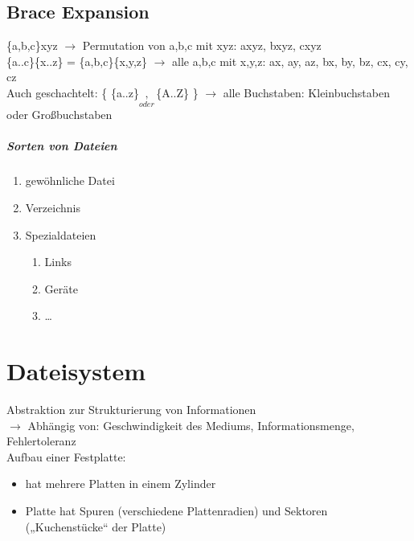 \section{Brace Expansion}
\{a,b,c\}xyz $\to$ Permutation von a,b,c mit xyz: axyz, bxyz, cxyz\\
\{a..c\}\{x..z\} = \{a,b,c\}\{x,y,z\} $\to$ alle a,b,c mit x,y,z: ax, ay, az, bx, by, bz, cx, cy, cz\\
Auch geschachtelt: \{ \{a..z\}$\underset{oder}{,}$\{A..Z\} \} $\to$ alle Buchstaben: Kleinbuchstaben oder Großbuchstaben


\paragraph{Sorten von Dateien}
\begin{enumerate}
\item gewöhnliche Datei
\item Verzeichnis
\item Spezialdateien
\begin{enumerate} [label=$\to$]
\item Links
\item Geräte
\item …
\end{enumerate}
\end{enumerate}

\chapter{Dateisystem}
Abstraktion zur Strukturierung von Informationen\\
$\rightarrow$ Abhängig von: Geschwindigkeit des Mediums, Informationsmenge, Fehlertoleranz\\
Aufbau einer Festplatte:
\begin{itemize}
\item hat mehrere Platten in einem Zylinder
\item Platte hat Spuren (verschiedene Plattenradien) und Sektoren („Kuchenstücke“ der Platte)
\end{itemize}
